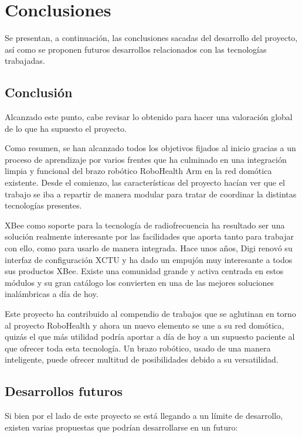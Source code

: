\chapter{Conclusiones}

Se presentan, a continuación, las conclusiones sacadas del desarrollo del proyecto, así como se proponen futuros desarrollos relacionados con las tecnologías trabajadas.

\section{Conclusión}

Alcanzado este punto, cabe revisar lo obtenido para hacer una valoración global de lo que ha supuesto el proyecto. 

Como resumen, se han alcanzado todos los objetivos fijados al inicio gracias a un proceso de aprendizaje por varios frentes que ha culminado en una integración limpia y funcional del brazo robótico RoboHealth Arm en la red domótica existente. Desde el comienzo, las características del proyecto hacían ver que el trabajo se iba a repartir de manera modular para tratar de coordinar la distintas tecnologías presentes.

XBee como soporte para la tecnología de radiofrecuencia ha resultado ser una solución realmente interesante por las facilidades que aporta tanto para trabajar con ello, como para usarlo de manera integrada. Hace unos años, Digi renovó su interfaz de configuración XCTU y ha dado un empujón muy interesante a todos sus productos XBee. Existe una comunidad grande y activa centrada en estos módulos y su gran catálogo los convierten en una de las mejores soluciones inalámbricas a día de hoy.

Este proyecto ha contribuido al compendio de trabajos que se aglutinan en torno al proyecto RoboHealth y ahora un nuevo elemento se une a su red domótica, quizás el que más utilidad podría aportar a día de hoy a un supuesto paciente al que ofrecer toda esta tecnología. Un brazo robótico, usado de una manera inteligente, puede ofrecer multitud de posibilidades debido a su versatilidad.

\section{Desarrollos futuros}

Si bien por el lado de este proyecto se está llegando a un límite de desarrollo, existen varias propuestas que podrían desarrollarse en un futuro:

